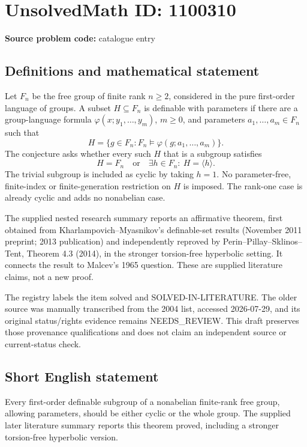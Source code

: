 \documentclass[11pt]{article}
\begin{document}
\section*{UnsolvedMath ID: 1100310}
\textbf{Source problem code:} catalogue entry
\subsection{Definitions and mathematical statement}
Let \(F_n\) be the free group of finite rank \(n\geq2\), considered in the pure first-order language of groups. A subset \(H\subseteq F_n\) is definable with parameters if there are a group-language formula \(\varphi(x;y_1,\ldots,y_m)\), \(m\geq0\), and parameters \(a_1,\ldots,a_m\in F_n\) such that
\[
H=\{g\in F_n:F_n\models\varphi(g;a_1,\ldots,a_m)\}.
\]
The conjecture asks whether every such \(H\) that is a subgroup satisfies
\[
H=F_n\quad\text{or}\quad \exists h\in F_n:\ H=\langle h\rangle.
\]
The trivial subgroup is included as cyclic by taking \(h=1\). No parameter-free, finite-index or finite-generation restriction on \(H\) is imposed. The rank-one case is already cyclic and adds no nonabelian case.

The supplied nested research summary reports an affirmative theorem, first obtained from Kharlampovich--Myasnikov's definable-set results (November 2011 preprint; 2013 publication) and independently reproved by Perin--Pillay--Sklinos--Tent, Theorem 4.3 (2014), in the stronger torsion-free hyperbolic setting. It connects the result to Malcev's 1965 question. These are supplied literature claims, not a new proof.

The registry labels the item solved and SOLVED-IN-LITERATURE. The older source was manually transcribed from the 2004 list, accessed 2026-07-29, and its original status/rights evidence remains NEEDS\_REVIEW. This draft preserves those provenance qualifications and does not claim an independent source or current-status check.
\subsection{Short English statement}
Every first-order definable subgroup of a nonabelian finite-rank free group, allowing parameters, should be either cyclic or the whole group. The supplied later literature summary reports this theorem proved, including a stronger torsion-free hyperbolic version.
\end{document}
